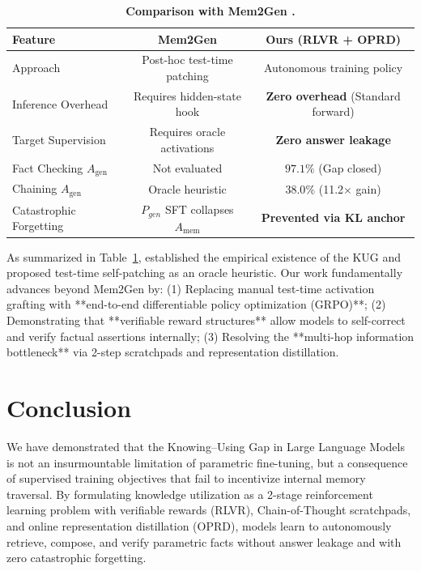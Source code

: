 \documentclass[11pt]{article}
\newcommand{\Amem}{A_{\text{mem}}}
\newcommand{\Agen}{A_{\text{gen}}}
\theoremstyle{definition}
\begin{document}
\begin{table}[t]
\centering
\small
\setlength{\tabcolsep}{3.5pt}
\caption{\textbf{Comparison with Mem2Gen \cite{dai2025mem2gen}.}}
\label{tab:comparison_dai}
\begin{tabular}{lcc}
\toprule
\textbf{Feature} & \textbf{Mem2Gen \cite{dai2025mem2gen}} & \textbf{Ours (RLVR + OPRD)} \\
\midrule
Approach & Post-hoc test-time patching & Autonomous training policy \\
Inference Overhead & Requires hidden-state hook & \textbf{Zero overhead} (Standard forward) \\
Target Supervision & Requires oracle activations & \textbf{Zero answer leakage} \\
Fact Checking $\Agen$ & Not evaluated & $\mathbf{97.1\%}$ (Gap closed) \\
Chaining $\Agen$ & Oracle heuristic & $\mathbf{38.0\%}$ (11.2$\times$ gain) \\
Catastrophic Forgetting & $P_{gen}$ SFT collapses $\Amem$ & \textbf{Prevented via KL anchor} \\
\bottomrule
\end{tabular}
\end{table}

As summarized in Table~\ref{tab:comparison_dai}, \citet{dai2025mem2gen} established the empirical existence of the KUG and proposed test-time self-patching as an oracle heuristic. Our work fundamentally advances beyond Mem2Gen by:
(1) Replacing manual test-time activation grafting with **end-to-end differentiable policy optimization (GRPO)**;
(2) Demonstrating that **verifiable reward structures** allow models to self-correct and verify factual assertions internally;
(3) Resolving the **multi-hop information bottleneck** via 2-step scratchpads and representation distillation.

\section{Conclusion}\label{sec:conclusion}

We have demonstrated that the Knowing--Using Gap in Large Language Models is not an insurmountable limitation of parametric fine-tuning, but a consequence of supervised training objectives that fail to incentivize internal memory traversal. By formulating knowledge utilization as a 2-stage reinforcement learning problem with verifiable rewards (RLVR), Chain-of-Thought scratchpads, and online representation distillation (OPRD), models learn to autonomously retrieve, compose, and verify parametric facts without answer leakage and with zero catastrophic forgetting.



\end{document}
